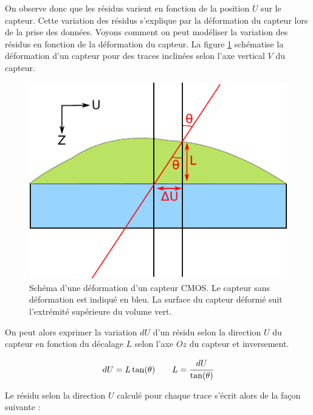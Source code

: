   \medskip
  
  On observe donc que les r\'esidus varient en fonction de la position $U$ sur le capteur. Cette variation des r\'esidus s'explique par la d\'eformation du capteur lors de la prise des donn\'ees. Voyons comment on peut mod\'eliser la variation des r\'esidus en fonction de la d\'eformation du capteur. La figure \ref{fig:DeformCMOS} sch\'ematise la d\'eformation d'un capteur pour des traces inclin\'ees selon l'axe vertical $V$ du capteur.

  \begin{figure}[!htb]
   \begin{center} 
    \includegraphics[scale=0.75]{./figures/deformations.pdf}
    \caption{Sch\'ema d'une d\'eformation d'un capteur CMOS. Le capteur sans d\'eformation est indiqu\'e en bleu. La surface du capteur d\'eform\'e suit l'extr\'emité sup\'erieure du volume vert.}
    \label{fig:DeformCMOS}
   \end{center}
  \end{figure}
  
  \medskip
  
  On peut alors exprimer la variation $dU$ d'un r\'esidu selon la direction $U$ du capteur en fonction du d\'ecalage $L$ selon l'axe $Oz$ du capteur et inversement.
   
  \begin{equation}
   dU = L \tan(\theta) \quad\quad L = \cfrac{dU}{\tan(\theta)}
  \label{eq:residusDeform}
  \end{equation}

  Le r\'esidu selon la direction $U$ calcul\'e pour chaque trace s'\'ecrit alors de la fa\c{c}on suivante :
  
